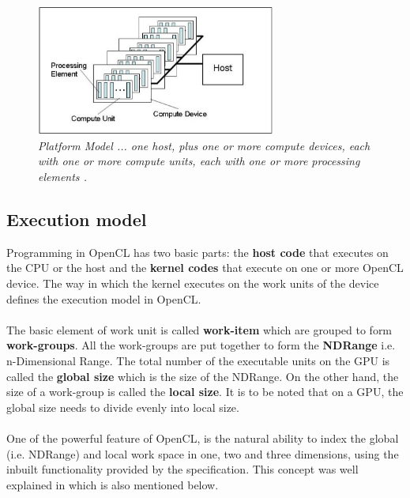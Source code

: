 \begin{figure}[ht]
\centerline{\includegraphics[width=0.7\textwidth]{platform_model.png}}
\caption[Platform Model]%
{\textit{Platform Model ... one host, plus one or more compute devices, each with one or more compute units, each with one or more processing elements \cite[p.~23]{OpenCL_specifications}.} \label{fig:platform_model}}
\end{figure}

\subsection{Execution model}
Programming in OpenCL has two basic parts: the \textbf{host code} that executes on the CPU or the host and the \textbf{kernel codes} that execute on one or more OpenCL device. The way in which the kernel executes on the work units of the device defines the execution model in OpenCL.

\paragraph{}
The basic element of work unit is called \textbf{work-item} which are grouped to form \textbf{work-groups}. All the work-groups are put together to form the \textbf{NDRange} i.e. n-Dimensional Range. The total number of the executable units on the GPU is called the \textbf{global size} which is the size of the NDRange. On the other hand, the size of a work-group is called the \textbf{local size}. It is to be noted that on a GPU, the global size needs to divide evenly into local size.

\paragraph{}
One of the powerful feature of OpenCL, is the natural ability to index the global (i.e. NDRange) and local work space in one, two and three dimensions, using the inbuilt functionality provided by the specification. This concept was well explained in \cite[p.~24-25]{OpenCL_specifications} which is also mentioned below.  

